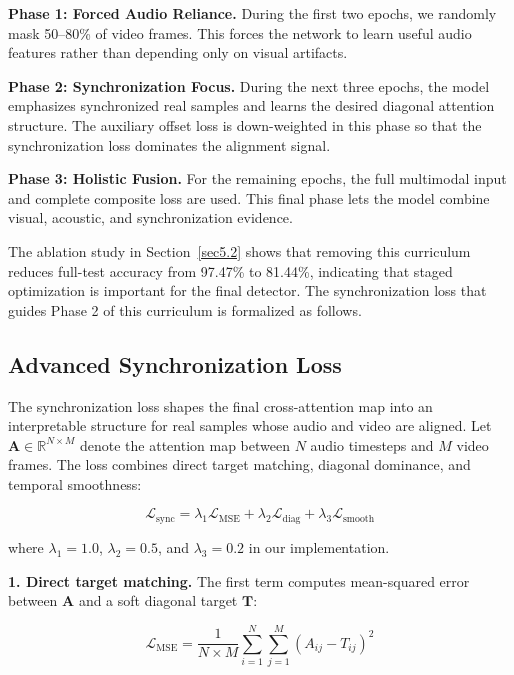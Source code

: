 \documentclass[pdflatex,sn-mathphys-num]{sn-jnl}
\begin{document}
\textbf{Phase 1: Forced Audio Reliance.} During the first two epochs, we randomly mask 50--80\% of video frames. This forces the network to learn useful audio features rather than depending only on visual artifacts.

\textbf{Phase 2: Synchronization Focus.} During the next three epochs, the model emphasizes synchronized real samples and learns the desired diagonal attention structure. The auxiliary offset loss is down-weighted in this phase so that the synchronization loss dominates the alignment signal.

\textbf{Phase 3: Holistic Fusion.} For the remaining epochs, the full multimodal input and complete composite loss are used. This final phase lets the model combine visual, acoustic, and synchronization evidence.

The ablation study in Section~\ref{sec5.2} shows that removing this curriculum reduces full-test accuracy from 97.47\% to 81.44\%, indicating that staged optimization is important for the final detector. The synchronization loss that guides Phase 2 of this curriculum is formalized as follows.


\subsection{Advanced Synchronization Loss}\label{sec3.3}

The synchronization loss shapes the final cross-attention map into an interpretable structure for real samples whose audio and video are aligned. Let $\mathbf{A}\in\mathbb{R}^{N\times M}$ denote the attention map between $N$ audio timesteps and $M$ video frames. The loss combines direct target matching, diagonal dominance, and temporal smoothness:

\begin{equation}\label{eq1}
\mathcal{L}_{\text{sync}} = \lambda_1 \mathcal{L}_{\text{MSE}} + \lambda_2 \mathcal{L}_{\text{diag}} + \lambda_3 \mathcal{L}_{\text{smooth}}
\end{equation}

where $\lambda_1=1.0$, $\lambda_2=0.5$, and $\lambda_3=0.2$ in our implementation.

\textbf{1. Direct target matching.} The first term computes mean-squared error between $\mathbf{A}$ and a soft diagonal target $\mathbf{T}$:

\begin{equation}\label{eq2}
\mathcal{L}_{\text{MSE}} = \frac{1}{N \times M} \sum_{i=1}^{N} \sum_{j=1}^{M} (A_{ij} - T_{ij})^2
\end{equation}
\end{document}
